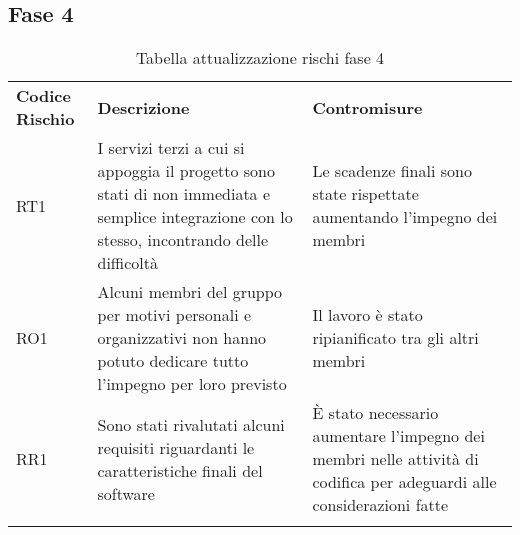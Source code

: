 \subsection{Fase 4}
\label{sec:fase_4}
\begin{center}
\renewcommand{\arraystretch}{1.5}
	\begin{longtable}[H]{  	>{\Centering}p{2cm}	
							>{\RaggedRight}p{6cm}	
							>{\RaggedRight}p{6cm}  
							}
							
		\rowcolor{tableHeadYellow}
		\textbf{Codice Rischio}   & \textbf{Descrizione} & \textbf{Contromisure}\\ 
		RT1	&	I servizi terzi a cui si appoggia il progetto sono stati di non immediata e semplice integrazione con lo stesso, incontrando delle difficoltà & Le scadenze finali sono state rispettate aumentando l'impegno dei membri\\
		RO1	&	Alcuni membri del gruppo per motivi personali e organizzativi non hanno potuto dedicare tutto l'impegno per loro previsto & Il lavoro è stato ripianificato tra gli altri membri\\
		RR1	&	Sono stati rivalutati alcuni requisiti riguardanti le caratteristiche finali del software & È stato necessario aumentare l'impegno dei membri nelle attività di codifica per adeguardi alle considerazioni fatte\\
		
		\rowcolor{white}
		\caption{Tabella attualizzazione rischi fase 4}
	\end{longtable}
\end{center}
